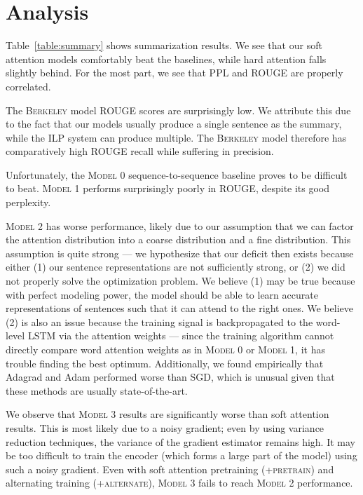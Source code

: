 \documentclass[12pt]{report}
\begin{document}
\section{Analysis}


Table~\ref{table:summary} shows summarization results. We see that our soft attention models comfortably beat the baselines, while hard attention falls slightly behind.
For the most part, we see that PPL and ROUGE are properly correlated. 

The \textsc{Berkeley} model ROUGE scores are surprisingly low. We attribute this due to the fact that our models usually produce a single sentence as the summary, while the ILP system can produce multiple. The \textsc{Berkeley} model therefore has comparatively high ROUGE recall while suffering in precision. 

Unfortunately, the \textsc{Model 0} sequence-to-sequence baseline proves to be difficult to beat. \textsc{Model 1} performs surprisingly poorly in ROUGE, despite its good perplexity.


\textsc{Model 2} has worse performance, likely due to our assumption that we can factor the attention distribution into a coarse distribution and a fine distribution.
This assumption is quite strong --- we hypothesize that our deficit then exists because either (1) our sentence representations are not sufficiently strong, or (2) we did not properly solve the optimization problem.
We believe (1) may be true because with perfect modeling power, the model should be able to learn accurate representations of sentences such that it can attend to the right ones.
We believe (2) is also an issue because the training signal is backpropagated to the word-level LSTM via the attention weights --- since the training algorithm cannot directly compare word attention weights as in \textsc{Model 0} or \textsc{Model 1}, it has trouble finding the best optimum.
Additionally, we found empirically that Adagrad and Adam performed worse than SGD, which is unusual given that these methods are usually state-of-the-art.

We observe that \textsc{Model 3} results are significantly worse than soft attention results. This is most likely due to a noisy gradient; even by using variance reduction techniques, the variance of the gradient estimator remains high. It may be too difficult to train the encoder (which forms a large part of the model) using such a noisy gradient. Even with soft attention pretraining (\textsc{+pretrain}) and alternating training (\textsc{+alternate}), \textsc{Model 3} fails to reach \textsc{Model 2} performance.
\end{document}
